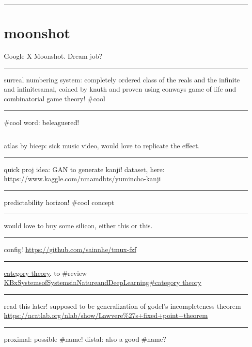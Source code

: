 \documentclass[letterpaper]{article}
\begin{document}
\noindent\rule{\textwidth}{0.5pt}

\section{moonshot}
\label{sec:orgb472be3}
Google X Moonshot. Dream job?

\noindent\rule{\textwidth}{0.5pt}

surreal numbering system: completely ordered class of the reals and the
infinite and infinitesamal, coined by knuth and proven using conways
game of life and combinatorial game theory! \#cool

\noindent\rule{\textwidth}{0.5pt}

\#cool word: beleaguered!

\noindent\rule{\textwidth}{0.5pt}

atlas by bicep: sick music video, would love to replicate the effect.

\noindent\rule{\textwidth}{0.5pt}

quick proj idea: GAN to generate kanji! dataset, here:
\url{https://www.kaggle.com/nmamdbts/yumincho-kanji}

\noindent\rule{\textwidth}{0.5pt}

predictability horizon! \#cool concept

\noindent\rule{\textwidth}{0.5pt}

would love to buy some silicon, either
\href{https://www.amazon.com/Silicon-Metal-99-999-Pure/dp/B08FVLJM8L}{this}
or
\href{https://www.amazon.com/Silicon-Wafer-Single-Sided-Polish/dp/B08RZ5ZYNF/}{this.}

\noindent\rule{\textwidth}{0.5pt}

config! \url{https://github.com/sainnhe/tmux-fzf}

\noindent\rule{\textwidth}{0.5pt}

\href{https://ncatlab.org/nlab/show/category+theory}{category theory}. to
\#review \href{KBxSystemsofSystemsinNatureandDeepLearning\#category theory.org}{KBxSystemsofSystemsinNatureandDeepLearning\#category theory}

\noindent\rule{\textwidth}{0.5pt}

read this later! supposed to be generalization of godel's incompleteness
theorem \url{https://ncatlab.org/nlab/show/Lawvere\%27s+fixed+point+theorem}

\noindent\rule{\textwidth}{0.5pt}

proximal: possible \#name! distal: also a good \#name?
\end{document}
